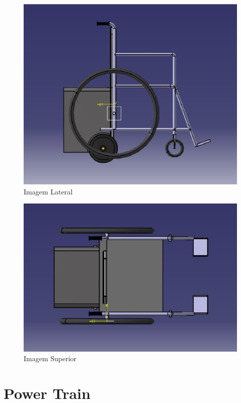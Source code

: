 \begin{figure}[!htb]
\centering
\includegraphics[keepaspectratio=true,scale=0.4]{figuras/estrutura/vista_lateral_cadeira}
\caption{Imagem Lateral}
\label{fig:lateral}
\end{figure}

\begin{figure}[!htb]
\centering
\includegraphics[keepaspectratio=true,scale=0.4]{figuras/estrutura/vista_superior}
\caption{Imagem Superior}
\label{fig:superior}
\end{figure}

\section{Power Train}

